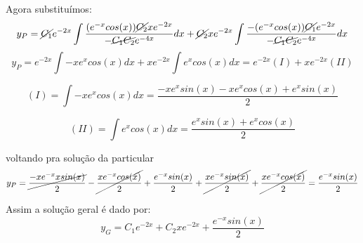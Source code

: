 Agora substituímos:
\begin{equation*}
    y_P = \cancel{C_1}e^{-2x}\int \frac{(e^{-x}cos(x))\cancel{C_2}xe^{-2x}}{-\cancel{C_1C_2}e^{-4x}} dx + \cancel{C_2}xe^{-2x}\int \frac{-(e^{-x}cos(x))\cancel{C_1}e^{-2x}}{-\cancel{C_1C_2}e^{-4x}}dx
\end{equation*}
\begin{equation*}
    y_P = e^{-2x}\int -xe^xcos(x) dx + xe^{-2x} \int e^xcos(x) dx = e^{-2x}(I) + xe^{-2x}(II)
\end{equation*}

\begin{equation*}
    (I) = \int -xe^xcos(x) dx = \frac{-xe^xsin(x) - xe^xcos(x) + e^xsin(x)}{2}
\end{equation*}

\begin{equation*}
    (II) = \int e^xcos(x) dx = \frac{e^xsin(x) + e^xcos(x) }{2}
\end{equation*}

voltando pra solução da particular
\begin{equation*}
    y_P =  \cancel{\frac{-xe^{-x}xsin(x)}{2}} - \cancel{\frac{xe^{-x}cos(x)}{2}} + \frac{e^{-x}sin(x)}{2} + \cancel{\frac{xe^{-x}sin(x)}{2}} + \cancel{\frac{xe^{-x}cos(x)}{2}} = \frac{e^{-x}sin(x)}{2}
\end{equation*}

Assim a solução geral é dado por:
\begin{equation*}
    \boxed{y_G = C_1e^{-2x} + C_2xe^{-2x} + \frac{e^{-x}sin(x)}{2}}
\end{equation*}